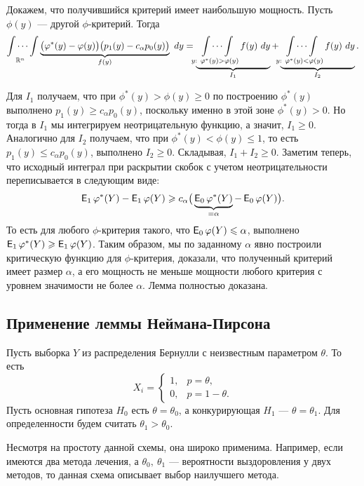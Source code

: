 Докажем, что получившийся критерий имеет наибольшую мощность. Пусть
$\phi(y)$ --- другой $\phi$-критерий. Тогда
\[
    \idotsint\limits_{\mathbb{R}^n} \underbrace{\big( \varphi^*(y) - \varphi(y)
    \big) \big( p_1(y) - c_\alpha p_0(y) \big)}_{f(y)}\ dy = 
    \underbrace{\idotsint\limits_{y:\ \varphi^*(y) > \varphi(y)}
    f(y)\ dy}_{I_1} + \underbrace{\idotsint\limits_{y:\ \varphi^*(y) <
    \varphi(y)} f(y)\ dy}_{I_2}.
    \]

Для $I_1$ получаем, что при $\phi^*(y) > \phi(y) \geqslant 0$ по
построению $\phi^*(y)$ выполнено $p_1(y) \geqslant c_\alpha p_0(y)$,
поскольку именно в этой зоне $\phi^*(y) > 0$. Но тогда в $I_1$ мы
интегрируем неотрицательную функцию, а значит, $I_1 \geqslant 0$.
Аналогично для $I_2$ получаем, что при $\phi^*(y) < \phi(y) \leqslant
1$, то есть $p_1(y) \leqslant c_\alpha p_0(y)$, выполнено $I_2
\geqslant 0$. Складывая, $I_1 + I_2 \geqslant 0$. Заметим теперь, что
исходный интеграл при раскрытии скобок с учетом неотрицательности
переписывается в следующим виде:
\[
    \E_1 \phi^*(Y) - \E_1 \phi(Y) \geqslant c_\alpha \big(
    \underbrace{\E_0 \phi^*(Y)}_{= \alpha} - \E_0 \phi(Y) \big).
    \]
То есть для любого $\phi$-критерия такого, что $\E_0 \phi(Y) \leqslant
\alpha$, выполнено $\E_1 \phi^*(Y) \geqslant \E_1 \phi(Y)$. Таким
образом, мы по заданному $\alpha$ явно построили критическую функцию
для $\phi$-критерия, доказали, что полученный критерий имеет размер
$\alpha$, а его мощность не меньше мощности любого критерия с
уровнем значимости не более $\alpha$. Лемма полностью доказана.

\subsection{Применение леммы Неймана-Пирсона}
Пусть выборка $Y$ из распределения Бернулли с неизвестным 
параметром $\theta$. То есть 
\[
    X_i =
    \begin{cases}
        1, & p = \theta,\\
        0, & p = 1 - \theta.
    \end{cases}
    \]
Пусть основная гипотеза $H_0$ есть $\theta = \theta_0$, а
конкурирующая $H_1$ --- $\theta = \theta_1$. Для определенности
будем считать $\theta_1 > \theta_0$.

Несмотря на простоту данной схемы, она широко применима. Например,
если имеются два метода лечения, а $\theta_0,\ \theta_1$ ---
вероятности выздоровления у двух методов, то данная схема описывает
выбор наилучшего метода.


